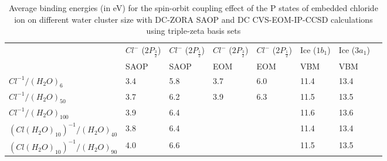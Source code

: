 \documentclass[a4paper,11pt]{report}
\begin{document}
\begin{table}[H]\small
\begin{center}
\captionsetup{font=footnotesize}
\caption{Average binding energies (in eV) for the spin-orbit coupling effect of the P states of embedded chloride ion on different water cluster size with DC-ZORA SAOP and DC CVS-EOM-IP-CCSD calculations using triple-zeta basis sets} \label{tab:1}
\begin{tabular}{|l|l|l|l|l|l|l|l|}
\hline
&$Cl^{-}$ ($2P_{\frac{3}{2}}$)&$Cl^{-}$ ($2P_{\frac{1}{2}}$)&$Cl^{-}$ ($2P_{\frac{3}{2}}$)&$Cl^{-}$ ($2P_{\frac{1}{2}}$)&Ice ($1b_{1}$)&Ice ($3a_{1}$)\\
&SAOP &SAOP&EOM&EOM&\hspace*{0.3cm}VBM &\hspace*{0.3cm}VBM\\ 
\hline
$Cl^{-1}/(H_{2}O)_{6}$&\hspace*{0.5cm}3.4&\hspace*{0.5cm}5.8&\hspace*{0.5cm}3.7&\hspace*{0.5cm}6.0&\hspace*{0.5cm}11.4&\hspace*{0.5cm}13.4\\
\hline
$Cl^{-1}/(H_{2}O)_{50}$&\hspace*{0.5cm}3.7&\hspace*{0.5cm}6.2&\hspace*{0.5cm}3.9&\hspace*{0.5cm}6.3&\hspace*{0.5cm}11.5&\hspace*{0.5cm}13.5\\
\hline
$Cl^{-1}/(H_{2}O)_{100}$&\hspace*{0.5cm}3.9&\hspace*{0.5cm}6.4&\hspace*{0.5cm}&\hspace*{0.5cm}&\hspace*{0.5cm}11.6&\hspace*{0.5cm}13.6\\
\hline
$(Cl(H_{2}O)_{10})^{-1}/(H_{2}O)_{40}$&\hspace*{0.5cm}3.8&\hspace*{0.5cm}6.4&\hspace*{0.5cm}&\hspace*{0.5cm}&\hspace*{0.5cm}11.4&\hspace*{0.5cm}13.4\\
\hline
$(Cl(H_{2}O)_{10})^{-1}/(H_{2}O)_{90}$&\hspace*{0.5cm}4.0&\hspace*{0.5cm}6.6&\hspace*{0.5cm}&\hspace*{0.5cm}&\hspace*{0.5cm}11.5&\hspace*{0.5cm}13.5\\
\hline
\end{tabular}
\label{table1m}
\end{center}
\end{table}
\end{document}

